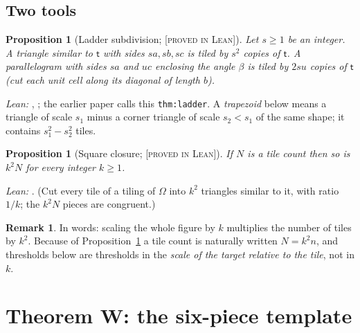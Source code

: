 \documentclass[11pt,reqno]{amsart}
\theoremstyle{plain}
\newtheorem{proposition}[theorem]{Proposition}
\theoremstyle{definition}
\newtheorem{remark}[theorem]{Remark}
\newcommand{\lab}[1]{\textup{[\textsc{#1}]}}
\newcommand{\PL}{\lab{proved in Lean}}
\newcommand{\tile}{\mathsf{t}}
\begin{document}
\subsection{Two tools}\label{sub:tools}
\begin{proposition}[Ladder subdivision; \PL{}]\label{prop:ladder}
Let $s\ge1$ be an integer. A triangle similar to $\tile$ with sides $sa,sb,sc$ is tiled by $s^2$ copies of $\tile$.
A parallelogram with sides $sa$ and $uc$ enclosing the angle $\beta$ is tiled by $2su$ copies of $\tile$ (cut each unit cell along its diagonal of length $b$).
\end{proposition}
\emph{Lean:} , ; the earlier paper calls this \texttt{thm:ladder}.
A \emph{trapezoid} below means a triangle of scale $s_1$ minus a corner triangle of scale $s_2<s_1$ of the same shape; it contains $s_1^2-s_2^2$ tiles.
\begin{proposition}[Square closure; \PL{}]\label{prop:square}
If $N$ is a tile count then so is $k^2N$ for every integer $k\ge1$.
\end{proposition}
\emph{Lean:} . (Cut every tile of a tiling of $\Omega$ into $k^2$ triangles similar to it, with ratio $1/k$; the $k^2N$ pieces are congruent.)
\begin{remark}
In words: scaling the whole figure by $k$ multiplies the number of tiles by $k^2$.
Because of Proposition~\ref{prop:square} a tile count is naturally written $N=k^2n$, and thresholds below are thresholds in the \emph{scale of the target relative to the tile}, not in $k$.
\end{remark}


\section{Theorem W: the six-piece template}\label{sec:thmW}
\end{document}
